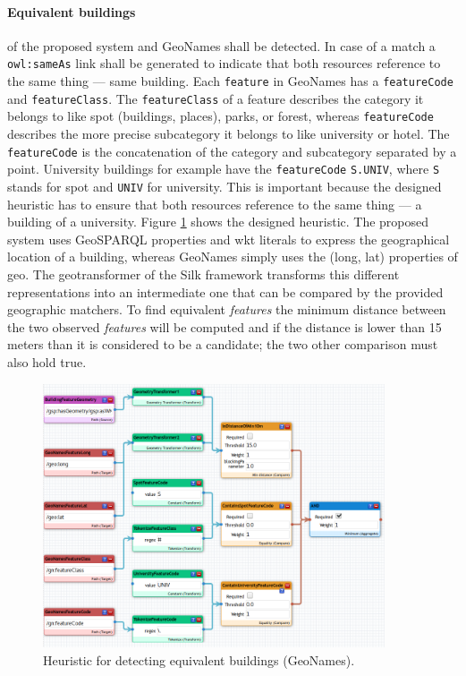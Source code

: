 \documentclass[draft,final]{vutinfth} %
\begin{document}
\paragraph{Equivalent buildings} of the proposed system and GeoNames shall be detected. In case of a match a \texttt{owl:sameAs} link shall be generated to indicate that both resources reference to the same thing --- same building. Each \texttt{feature} in GeoNames has a \texttt{featureCode} and \texttt{featureClass}. The \texttt{featureClass} of a feature describes the category it belongs to like spot (buildings, places), parks, or forest, whereas \texttt{featureCode} describes the more precise subcategory it belongs to like university or hotel. The \texttt{featureCode} is the concatenation of the category and subcategory separated by a point. University buildings for example have the \texttt{featureCode} \texttt{S.UNIV}, where \texttt{S} stands for spot and \texttt{UNIV} for university. This is important because the designed heuristic has to ensure that both resources reference to the same thing --- a building of a university. Figure \ref{fig:solution-architectural-prototype:ld-management:geonames-equivalent} shows the designed heuristic. The proposed system uses GeoSPARQL properties and \gls{wkt} literals to express the geographical location of a building, whereas GeoNames simply uses the (long, lat) properties of \gls{geo}. The geotransformer of the Silk framework transforms this different representations into an intermediate one that can be compared by the provided geographic matchers. To find equivalent \textit{features} the minimum distance between the two observed \textit{features} will be computed and if the distance is lower than 15 meters than it is considered to be a candidate; the two other comparison must also hold true.  

\begin{figure}[h]
    \centering
    \includegraphics[width=0.9\textwidth]{graphics/linking/geoNamesFeatureSameAs.png}
    \caption{Heuristic for detecting equivalent buildings (GeoNames).}
    \label{fig:solution-architectural-prototype:ld-management:geonames-equivalent}
\end{figure}
\end{document}
